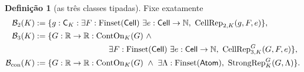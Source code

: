 \documentclass[12pt,a4paper]{article}
\theoremstyle{preciso}
\theoremstyle{definition}
\newtheorem{definicao}[teorema]{Definição}
\newcommand{\N}{\mathbb N}
\newcommand{\R}{\mathbb R}
\newcommand{\Atoms}{\mathsf{Atom}}
\newcommand{\Cell}{\mathsf{Cell}}
\newcommand{\CK}{\mathsf C_K}
\newcommand{\FS}{\operatorname{Finset}}
\newcommand{\Str}{\operatorname{StrongRep}}
\theoremstyle{preciso}
\theoremstyle{preciso}
\theoremstyle{preciso}
\theoremstyle{preciso}
\theoremstyle{definition}
\theoremstyle{preciso}
\theoremstyle{definition}
\theoremstyle{preciso}
\theoremstyle{preciso}
\theoremstyle{definition}
\begin{document}
\begin{definicao}[as três classes tipadas]\label{map:normalizacao:5.3}\label{normalizacao:def:threeclasses}
Fixe exatamente
\begin{align*}
 \mathcal B_2(K)&:=
 \{g:\CK:\exists F:\FS(\Cell)\ \exists e:\Cell\to\N,\
                  \operatorname{CellRep}_{2,K}(g,F,e)\},\\
 \mathcal B_3(K)&:=
 \{G:\R\to\R:\operatorname{ContOn}_K(G)\ \land\\
 &\hspace{32mm}\exists F:\FS(\Cell)\ \exists e:\Cell\to\N,\
                   \operatorname{CellRep}^G_{3,K}(G,F,e)\},\\
 \mathcal B_{\rm con}(K)&:=
 \{G:\R\to\R:\operatorname{ContOn}_K(G)\ \land\
                  \exists\Lambda:\FS(\Atoms),\ \Str^G_K(G,\Lambda)\}.
\end{align*}
\end{definicao}
\end{document}
